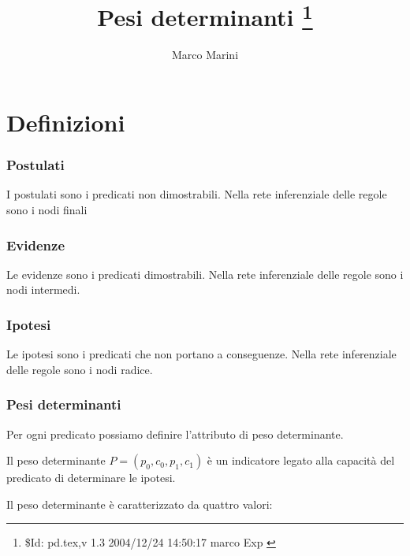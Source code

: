 \documentclass{article}
\begin{document}
  \title{Pesi determinanti \thanks{\$Id: pd.tex,v 1.3 2004/12/24 14:50:17 marco Exp $ $}}
  \author{Marco Marini}
  \maketitle
  
  \part{Definizioni}
  \section{Postulati}
  
  I postulati sono i predicati non dimostrabili.
  Nella rete inferenziale delle regole sono i nodi finali
  
  \section{Evidenze}
  
  Le evidenze sono i predicati dimostrabili.
  Nella rete inferenziale delle regole sono i nodi intermedi.
  
  \section{Ipotesi}
  
  Le ipotesi sono i predicati che non portano a conseguenze.
  Nella rete inferenziale delle regole sono i nodi radice.

  \section{Pesi determinanti}
  
  Per ogni predicato possiamo definire l'attributo di peso determinante.

  Il peso determinante $P=(p_0,c_0,p_1,c_1)$ \`e un indicatore
  legato alla capacit\`a del  predicato di determinare le ipotesi.
  
  Il peso determinante \`e caratterizzato da quattro valori:
  
\end{document}
